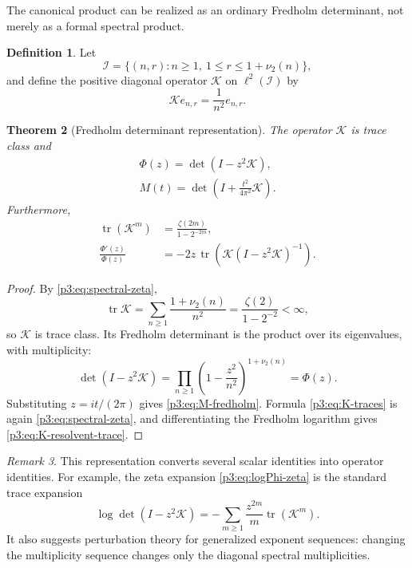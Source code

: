 \documentclass[11pt]{article}
\newtheorem{theorem}{Theorem}[section]
\theoremstyle{definition}
\newtheorem{definition}[theorem]{Definition}
\theoremstyle{remark}
\newtheorem{remark}[theorem]{Remark}
\newcommand{\tr}{\operatorname{tr}}
\newcommand{\cK}{\mathcal K}
\begin{document}
The canonical product can be realized as an ordinary Fredholm determinant, not merely as a
formal spectral product.

\begin{definition}
Let
\begin{equation}
 \mathcal I=\{(n,r):n\ge1,\ 1\le r\le 1+\nu_2(n)\},
\end{equation}
and define the positive diagonal operator \(\cK\) on \(\ell^2(\mathcal I)\) by
\begin{equation}
 \cK e_{n,r}=\frac1{n^2}e_{n,r}.                             \label{p3:eq:K-def}
\end{equation}
\end{definition}

\begin{theorem}[Fredholm determinant representation]\label{p3:thm:fredholm}
The operator \(\cK\) is trace class and
\begin{align}
 \boxed{\Phi(z)=\det(I-z^2\cK)},                             \label{p3:eq:Phi-fredholm}\\
 \boxed{M(t)=\det\!\left(I+\frac{t^2}{4\pi^2}\cK\right)}.  \label{p3:eq:M-fredholm}
\end{align}
Furthermore,
\begin{align}
 \tr(\cK^m)&=\frac{\zeta(2m)}{1-2^{-2m}},                   \label{p3:eq:K-traces}\\
 \frac{\Phi'(z)}{\Phi(z)}
 &=-2z\,\tr\!\left(\cK(I-z^2\cK)^{-1}\right).            \label{p3:eq:K-resolvent-trace}
\end{align}
\end{theorem}

\begin{proof}
By \eqref{p3:eq:spectral-zeta},
\[
 \tr\cK=\sum_{n\ge1}\frac{1+\nu_2(n)}{n^2}
 =\frac{\zeta(2)}{1-2^{-2}}<\infty,
\]
so \(\cK\) is trace class.  Its Fredholm determinant is the product over its eigenvalues,
with multiplicity:
\[
 \det(I-z^2\cK)
 =\prod_{n\ge1}\left(1-\frac{z^2}{n^2}\right)^{1+\nu_2(n)}
 =\Phi(z).
\]
Substituting \(z=it/(2\pi)\) gives \eqref{p3:eq:M-fredholm}.  Formula
\eqref{p3:eq:K-traces} is again \eqref{p3:eq:spectral-zeta}, and differentiating the Fredholm
logarithm gives \eqref{p3:eq:K-resolvent-trace}.
\end{proof}

\begin{remark}
This representation converts several scalar identities into operator identities.  For
example, the zeta expansion \eqref{p3:eq:logPhi-zeta} is the standard trace expansion
\[
 \log\det(I-z^2\cK)=-\sum_{m\ge1}\frac{z^{2m}}m\tr(\cK^m).
\]
It also suggests perturbation theory for generalized exponent sequences: changing the
multiplicity sequence changes only the diagonal spectral multiplicities.
\end{remark}
\end{document}
